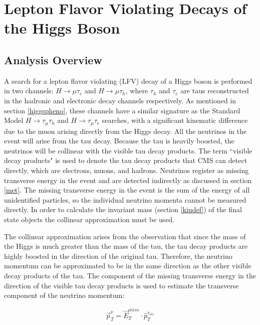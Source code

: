 \documentclass[oneside, letterpaper, oldfontcommands]{memoir}
\begin{document}
\chapter{Lepton Flavor Violating Decays of the Higgs Boson}\label{lfv}

\section{Analysis Overview}\label{lfvoverview}
\qquad A search for a lepton flavor violating (LFV) decay of a Higgs boson is performed in two channels: $H \rightarrow \mu\tau_{e}$ and $H \rightarrow \mu\tau_{h}$, where $\tau_{h}$ and $\tau_{e}$ are taus reconstructed in the hadronic and electronic decay channels respectively. As mentioned in section \ref{higgspheno}, these channels have a similar signature as the Standard Model $H \rightarrow \tau_{\mu} \tau_{h}$ and $H \rightarrow \tau_{\mu}\tau_{e}$ searches, with a significant kinematic difference due to the muon arising directly from the Higgs decay. All the neutrinos in the event will arise from the tau decay. Because the tau is heavily boosted, the neutrinos will be collinear with the visible tau decay products. The term ``visible decay products" is used to denote the tau decay products that CMS can detect directly, which are electrons, muons, and hadrons. Neutrinos register as missing transverse energy in the event and are detected indirectly as discussed in section \ref{met}. The missing transverse energy in the event is the sum of the energy of all unidentified particles, so the individual neutrino momenta cannot be measured directly. In order to calculate the invariant mass (section \ref{kindef}) of the final state objects the collinear approximation must be used.

\qquad The collinear approximation\cite{Ellis:1987xu} arises from the observation that since the mass of the Higgs is much greater than the mass of the tau, the tau decay products are highly boosted in the direction of the original tau. Therefore, the neutrino momentum can be approximated to be in the same direction as the other visible decay products of the tau. The component of the missing transverse energy in the direction of the visible tau decay products is used to estimate the transverse component of the neutrino momentum:

\begin{equation}
\vec{p}_{T}^{\nu} = \vec{E}_{T}^{miss} \cdot \hat{p}_{T}^{\tau_{vis}}
\end{equation}
\end{document}

